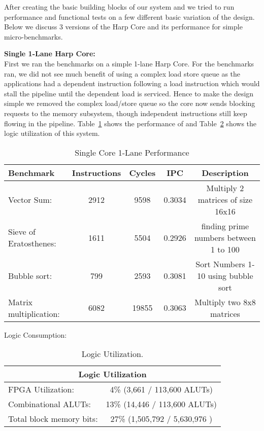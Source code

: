 After creating the basic building blocks of our system and we tried to run performance and functional tests on a few different basic variation of the design. Below we discuss 3 versions of the Harp Core and its performance for simple micro-benchmarks.

\textbf{Single 1-Lane Harp Core:}\\
First we ran the benchmarks on a simple 1-lane Harp Core. For the benchmarks ran, we did not see much benefit of using a complex load store queue as the applications had a dependent instruction following a load instruction which would stall the pipeline until the dependent load is serviced. Hence to make the design simple we removed the complex load/store queue so the core now sends blocking requests to the memory subsystem, though independent instructions still keep flowing in the pipeline. Table~\ref{table:perf1} shows the performance of and Table~\ref{table:fpga_util1} shows the logic utilization of this system.
\begin{table}[!htbp]
  \centering
  \begin{tabular}{|l|c|c|c|c|}
    \hline
Benchmark		&Instructions 	&Cycles		&IPC		&Description\\
    \hline
Vector Sum:		&2912		&9598		&0.3034 	&Multiply 2 matrices of size 16x16 \\
Sieve of Eratosthenes:	&1611		&5504		&0.2926 	&finding prime numbers between 1 to 100\\
Bubble sort:		&799		&2593		&0.3081 	&Sort Numbers 1-10 using bubble sort\\
Matrix multiplication:	&6082		&19855		&0.3063 	&Multiply two 8x8 matrices\\
    \hline
  \end{tabular}
  \caption{Single Core 1-Lane Performance}
  \label{table:perf1}
\end{table}

Logic Consumption:
\begin{table}[!htbp]
  \centering
  \begin{tabular}{|l|c|}
    \hline
    \multicolumn{2}{|c|}{Logic Utilization} \\
    \hline
FPGA Utilization:				&4\%  (3,661 / 113,600 ALUTs)\\
Combinational ALUTs:			&13\%       (14,446 / 113,600 ALUTs)\\
Total block memory bits:	&27\%   (1,505,792 / 5,630,976 )\\
    \hline
  \end{tabular}
  \caption{Logic Utilization.}
  \label{table:fpga_util1}
\end{table}

